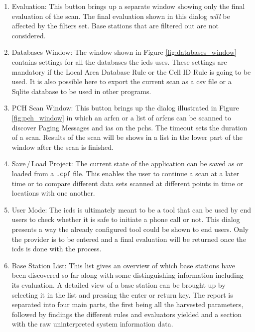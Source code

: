 \begin{enumerate}
\item Evaluation: This button brings up a separate window showing only the final evaluation of the scan.
The final evaluation shown in this dialog \emph{will} be affected by the filters set.
Base stations that are filtered out are not considered.

\item Databases Window: The window shown in Figure \ref{fig:databases_window} contains settings for all the databases the \gls{icds} uses.
These settings are mandatory if the Local Area Database Rule or the Cell ID Rule is going to be used.
It is also possible here to export the current scan as a \gls{csv} file or a Sqlite database to be used in other programs.

\item PCH Scan Window: This button brings up the dialog illustrated in Figure \ref{fig:pch_window} in which an \gls{arfcn} or a list of \glspl{arfcn} can be scanned to discover Paging Messages and \glspl{ia} on the \glspl{pch}.
The timeout sets the duration of a scan.
Results of the scan will be shows in a list in the lower part of the window after the scan is finished.

\item Save\,/\,Load Project: The current state of the application can be saved as or loaded from a \texttt{.cpf} file.
This enables the user to continue a scan at a later time or to compare different data sets scanned at different points in time or locations with one another.

\item User Mode: The \gls{icds} is ultimately meant to be a tool that can be used by end users to check whether it is safe to initiate a phone call or not.
This dialog presents a way the already configured tool could be shown to end users.
Only the provider is to be entered and a final evaluation will be returned once the \gls{icds} is done with the process.

\item Base Station List: This list gives an overview of which base stations have been discovered so far along with some distinguishing information including its evaluation.
A detailed view of a base station can be brought up by selecting it in the list and pressing the enter or return key.
The report is separated into four main parts, the first being all the harvested parameters, followed by findings the different rules and evaluators yielded and a section with the raw uninterpreted system information data.
 

\end{enumerate}
